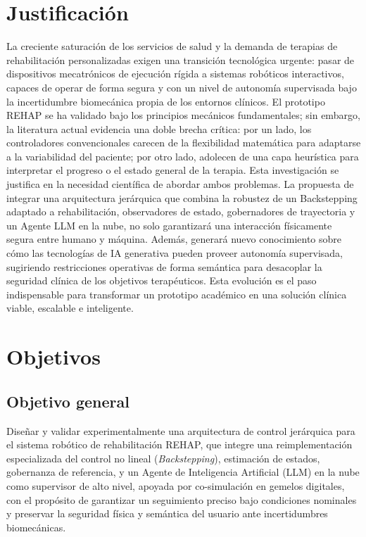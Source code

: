 \documentclass[a4paper,12pt]{article}
\begin{document}
\newpage


\section{Justificación}

La creciente saturación de los servicios de salud y la demanda de terapias de rehabilitación personalizadas exigen una transición tecnológica urgente: pasar de dispositivos mecatrónicos de ejecución rígida a sistemas robóticos interactivos, capaces de operar de forma segura y con un nivel de autonomía supervisada bajo la incertidumbre biomecánica propia de los entornos clínicos.
El prototipo REHAP se ha validado bajo los principios mecánicos fundamentales; sin embargo, la literatura actual evidencia una doble brecha crítica: por un lado, los controladores convencionales carecen de la flexibilidad matemática para adaptarse a la variabilidad del paciente; por otro lado, adolecen de una capa heurística para interpretar el progreso o el estado general de la terapia.
Esta investigación se justifica en la necesidad científica de abordar ambos problemas. La propuesta de integrar una arquitectura jerárquica que combina la robustez de un Backstepping adaptado a rehabilitación, observadores de estado, gobernadores de trayectoria y un Agente LLM en la nube, no solo garantizará una interacción físicamente segura entre humano y máquina. Además, generará nuevo conocimiento sobre cómo las tecnologías de IA generativa pueden proveer autonomía supervisada, sugiriendo restricciones operativas de forma semántica para desacoplar la seguridad clínica de los objetivos terapéuticos. Esta evolución es el paso indispensable para transformar un prototipo académico en una solución clínica viable, escalable e inteligente.

\newpage





\section{Objetivos}

\subsection{Objetivo general}

Diseñar y validar experimentalmente una arquitectura de control jerárquica para el sistema robótico de rehabilitación REHAP, que integre una reimplementación especializada del control no lineal (\textit{Backstepping}), estimación de estados, gobernanza de referencia, y un Agente de Inteligencia Artificial (LLM) en la nube como supervisor de alto nivel, apoyada por co-simulación en gemelos digitales, con el propósito de garantizar un seguimiento preciso bajo condiciones nominales y preservar la seguridad física y semántica del usuario ante incertidumbres biomecánicas.
\end{document}
